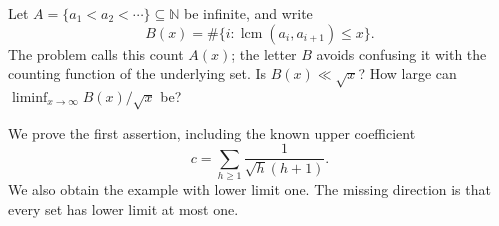 Let $A=\{a_1<a_2<\cdots\}\subseteq\mathbb N$ be infinite, and write
\[B(x)=\#\{i:\operatorname{lcm}(a_i,a_{i+1})\le x\}.\]
The problem calls this count $A(x)$; the letter $B$ avoids confusing it with the counting function of the underlying set. Is $B(x)\ll\sqrt x$? How large can $\liminf_{x\to\infty}B(x)/\sqrt x$ be?

We prove the first assertion, including the known upper coefficient
\[c=\sum_{h\ge1}\frac1{\sqrt h(h+1)}.\]
We also obtain the example with lower limit one. The missing direction is that every set has lower limit at most one.
